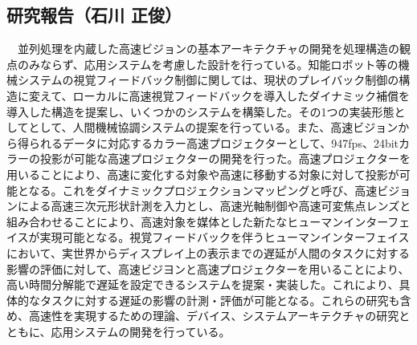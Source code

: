 \subsection{研究報告（石川 正俊）}

　並列処理を内蔵した高速ビジョンの基本アーキテクチャの開発を処理構造の観点のみならず、応用システムを考慮した設計を行っている。知能ロボット等の機械システムの視覚フィードバック制御に関しては、現状のプレイバック制御の構造に変えて、ローカルに高速視覚フィードバックを導入したダイナミック補償を導入した構造を提案し、いくつかのシステムを構築した。その1つの実装形態としてとして、人間機械協調システムの提案を行っている。また、高速ビジョンから得られるデータに対応するカラー高速プロジェクターとして、947fps、24bitカラーの投影が可能な高速プロジェクターの開発を行った。高速プロジェクターを用いることにより、高速に変化する対象や高速に移動する対象に対して投影が可能となる。これをダイナミックプロジェクションマッピングと呼び、高速ビジョンによる高速三次元形状計測を入力とし、高速光軸制御や高速可変焦点レンズと組み合わせることにより、高速対象を媒体とした新たなヒューマンインターフェイスが実現可能となる。視覚フィードバックを伴うヒューマンインターフェイスにおいて、実世界からディスプレイ上の表示までの遅延が人間のタスクに対する影響の評価に対して、高速ビジヨンと高速プロジェクターを用いることにより、高い時間分解能で遅延を設定できるシステムを提案・実装した。これにより、具体的なタスクに対する遅延の影響の計測・評価が可能となる。これらの研究も含め、高速性を実現するための理論、デバイス、システムアーキテクチャの研究とともに、応用システムの開発を行っている。